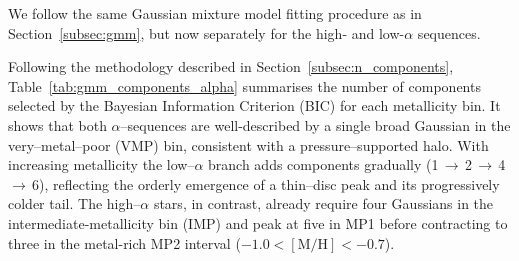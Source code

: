 \documentclass[a4paper,12pt]{article}
\begin{document}
We follow the same Gaussian mixture model fitting procedure as in
Section~\ref{subsec:gmm}, but now separately for the high- and low-$\alpha$ sequences.

\begin{table}[H]
  \centering
  \caption{Number of Gaussian Mixture components selected by the BIC for each metallicity bin, split by $\alpha$-sequence.}
    \label{tab:gmm_components_alpha}
\end{table}

Following the methodology described in Section~\ref{subsec:n_components}, Table~\ref{tab:gmm_components_alpha} summarises the number of components selected by the Bayesian Information Criterion (BIC) for each metallicity bin.
It shows that both $\alpha$–sequences are well-described by a single broad Gaussian in the very–metal–poor (VMP) bin, consistent with a pressure–supported halo.  
With increasing metallicity the low–$\alpha$ branch adds components gradually (1\,$\rightarrow$\,2\,$\rightarrow$\,4\,$\rightarrow$\,6), reflecting the orderly emergence of a thin–disc peak and its progressively colder tail.  
The high–$\alpha$ stars, in contrast, already require four Gaussians in the intermediate-metallicity bin (IMP) and peak at five in MP1 before contracting to three in the metal-rich MP2 interval ($-1.0<\mathrm{[M/H]}<-0.7$).
\end{document}
